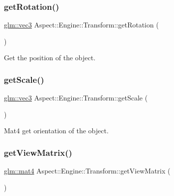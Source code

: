 \subsubsection{\texorpdfstring{get\+Rotation()}{getRotation()}}
{\footnotesize\ttfamily \mbox{\hyperlink{group__core__types_ga1c47e8b3386109bc992b6c48e91b0be7}{glm\+::vec3}} Aspect\+::\+Engine\+::\+Transform\+::get\+Rotation (\begin{DoxyParamCaption}{ }\end{DoxyParamCaption})\hspace{0.3cm}{\ttfamily [inline]}}



Get the position of the object. 

\mbox{\label{class_aspect_1_1_engine_1_1_transform_af606b12afa98e381b03af23063ce3762}} 
\subsubsection{\texorpdfstring{get\+Scale()}{getScale()}}
{\footnotesize\ttfamily \mbox{\hyperlink{group__core__types_ga1c47e8b3386109bc992b6c48e91b0be7}{glm\+::vec3}} Aspect\+::\+Engine\+::\+Transform\+::get\+Scale (\begin{DoxyParamCaption}{ }\end{DoxyParamCaption})\hspace{0.3cm}{\ttfamily [inline]}}



Mat4 get orientation of the object. 

\mbox{\label{class_aspect_1_1_engine_1_1_transform_abda17c27d2ebf07d0e2acd66f953f93f}} 
\subsubsection{\texorpdfstring{get\+View\+Matrix()}{getViewMatrix()}}
{\footnotesize\ttfamily \mbox{\hyperlink{group__core__types_ga7dcd2365c2e368e6af5b7adeb6a9c8df}{glm\+::mat4}} Aspect\+::\+Engine\+::\+Transform\+::get\+View\+Matrix (\begin{DoxyParamCaption}{ }\end{DoxyParamCaption})}



